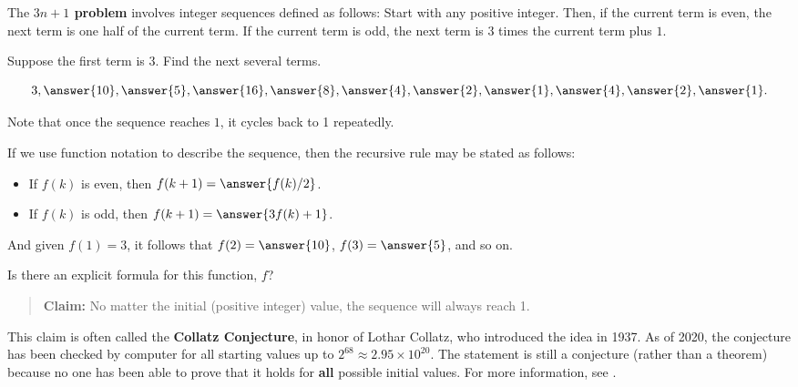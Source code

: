 \documentclass[nooutcomes]{ximera}
\begin{document}
\begin{problem}
The \textbf{$3n+1$ problem} involves integer sequences defined as follows:  Start with any positive integer. Then, if the current term is even, the next term is one half of the current term. If the current term is odd, the next term is $3$ times the current term plus $1$. 

Suppose the first term is 3.  Find the next several terms.  

\[
3, \answer{10}, \answer{5}, \answer{16}, \answer{8}, \answer{4}, \answer{2}, \answer{1}, \answer{4}, \answer{2}, \answer{1}.  
\]

Note that once the sequence reaches $1$, it cycles back to 1 repeatedly.  
\begin{problem}
If we use function notation to describe the sequence, then the recursive rule may be stated as follows: 

\begin{itemize}
\item If $f(k)$ is even, then $f(k+1) = \answer{f(k)/2}$. 
\item If $f(k)$ is odd, then $f(k+1) = \answer{3f(k) + 1}$.  
\end{itemize}

And given $f(1)=3$, it follows that $f(2)=\answer{10}$, $f(3)=\answer{5}$, and so on.  

\begin{problem}
Is there an explicit formula for this function, $f$?  
\begin{multipleChoice}
\end{multipleChoice}

\begin{feedback}
\begin{quote}
\textbf{Claim:} No matter the initial (positive integer) value, the sequence will always reach 1.  
\end{quote}
This claim is often called the \textbf{Collatz Conjecture}, in honor of Lothar Collatz, who introduced the idea in 1937.  As of 2020, the conjecture has been checked by computer for all starting values up to $2^{68} \approx 2.95\times 10^{20}$. The statement is still a conjecture (rather than a theorem) because no one has been able to prove that it holds for \textbf{all} possible initial values.  For more information, see . 
\end{feedback}

\end{problem}

\end{problem}

\end{problem}
\end{document}
